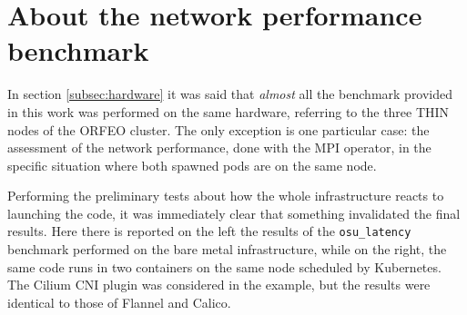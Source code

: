 \chapter{About the network performance benchmark}\label{appendix:kprod}

In section \ref{subsec:hardware} it was said that \textit{almost} all the
benchmark provided in this work was performed on the same hardware, referring to
the three THIN nodes of the ORFEO cluster.
The only exception is one particular case: the assessment of the network
performance, done with the MPI operator, in the specific situation where both
spawned pods are on the same node.

Performing the preliminary tests about how the whole infrastructure reacts to
launching the code, it was immediately clear that something invalidated the
final results.
Here there is reported on the left the results of the \texttt{osu\_latency}
benchmark performed on the bare metal infrastructure, while on the right, the
same code runs in two containers on the same node scheduled by
Kubernetes. The Cilium CNI plugin was considered in the example, but the results
were identical to those of Flannel and Calico.


